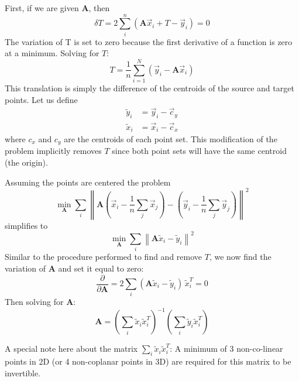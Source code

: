 First, if we are given $\mathbf{A}$, then 
\begin{equation}
\delta T = 2 \sum_i^n \left(\mathbf{A}\vec{x}_i + T-\vec{y}_i\right) = 0
\end{equation}
The variation of T is set to zero because the first derivative of a function is zero at a minimum.
Solving for $T$:
\begin{equation}
T=\frac{1}{n}\sum_{i=1}^N \left(\vec{y}_i-\mathbf{A}\vec{x}_i\right)
\end{equation}
This translation is simply the difference of the centroids of the source and target points. Let us define
\begin{align}
\tilde{y}_i &= \vec{y}_i - \vec{c}_y\\
\tilde{x}_i &= \vec{x}_i - \vec{c}_x
\end{align}
where $c_x$ and $c_y$ are the centroids of each point set. This modification of the problem implicitly removes $T$ since both point sets will have the same centroid (the origin).

Assuming the points are centered the problem
\begin{equation}
\underset{\mathbf{A}}{\min}\sum_i\left\|\mathbf{A}\left(\vec{x}_i-\frac{1}{n}\sum_j \vec{x}_j\right) - \left(\vec{y}_i-\frac{1}{n}\sum_j \vec{y}_j\right)\right\|^2
\end{equation}
simplifies to
\begin{equation}
\underset{\mathbf{A}}{\min}\sum_i\left\|\mathbf{A}\tilde{x}_i - \tilde{y}_i\right\|^2
\end{equation}
Similar to the procedure performed to find and remove $T$, we now find the variation of $\mathbf{A}$ and set it equal to zero:
\begin{equation}
\frac{\partial}{\partial\mathbf{A}} = 2 \sum_i \left(\mathbf{A}\tilde{x}_i-\tilde{y}_i\right)\, \tilde{x}_i^T = 0
\end{equation}
Then solving for $\mathbf{A}$:
\begin{equation}
\mathbf{A}=\left(\sum_i\tilde{x}_i\tilde{x}_i^T\right)^{-1}\left(\sum_i\tilde{y}_i\tilde{x}_i^T\right)
\end{equation}

A special note here about the matrix $\sum_i\tilde{x}_i\tilde{x}_i^T$: A minimum of 3 non-co-linear points in 2D (or 4 non-coplanar points in 3D) are required for this matrix to be invertible. 

